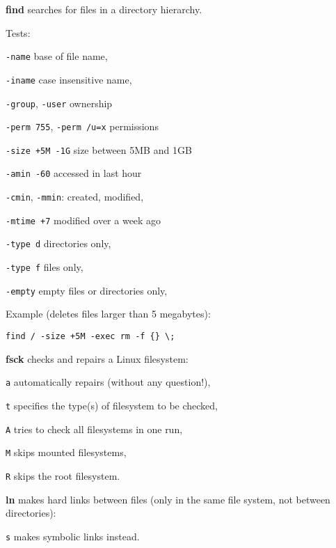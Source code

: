 \begin{compactenum}
	\item [\cmdvar] \textbf{find} searches for files in a directory hierarchy.
	\item Tests:
	\item [] \texttt{-name} \hfill base of file name,
	\item [] \texttt{-iname} \hfill case insensitive name,
	\item [] \texttt{-group}, \texttt{-user} \hfill ownership
	\item [] \texttt{-perm 755}, \texttt{-perm /u=x} \hfill permissions
	\item [] \texttt{-size +5M -1G} \hfill size between 5MB and 1GB
	\item [] \texttt{-amin -60} \hfill accessed in last hour
	\item [] \texttt{-cmin}, \texttt{-mmin}: \hfill created, modified,
	\item [] \texttt{-mtime +7} \hfill modified over a week ago
	\item [] \texttt{-type d} \hfill directories only,
	\item [] \texttt{-type f} \hfill files only,
	\item [] \texttt{-empty} \hfill empty files or directories only,
	\item Example (deletes files larger than 5 megabytes): 
	\item [] \texttt{find / -size +5M -exec rm -f \{\} \textbackslash{};}
\end{compactenum}

\begin{compactenum}
	\item [\cmdutil] \textbf{fsck} checks and repairs a Linux filesystem:
	\item [\texttt{a}] automatically repairs (without any question!),
	\item [\texttt{t}] specifies the type(s) of filesystem to be checked,
	\item [\texttt{A}] tries to check all filesystems in one run,
	\item [\texttt{M}] skips mounted filesystems,
	\item [\texttt{R}] skips the root filesystem.
\end{compactenum}

\begin{compactenum}
	\item [\cmdcore] \textbf{ln} makes hard links between files
	(only in the same file system, not between directories):
	\item [\texttt{s}]  makes symbolic links instead.
\end{compactenum}

